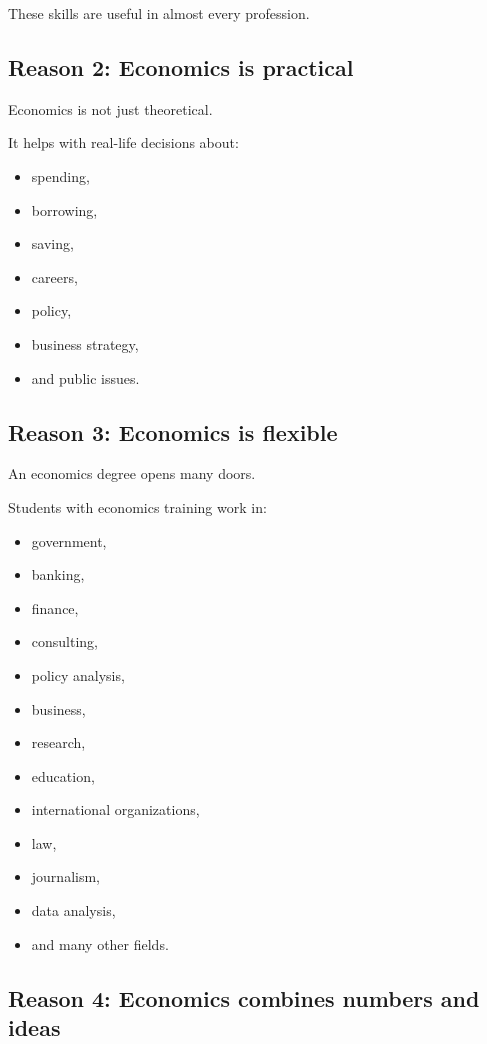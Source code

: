 \documentclass[12pt]{article}
\begin{document}
These skills are useful in almost every profession.

\subsection*{Reason 2: Economics is practical}

Economics is not just theoretical.

It helps with real-life decisions about:
\begin{itemize}[leftmargin=2em]
    \item spending,
    \item borrowing,
    \item saving,
    \item careers,
    \item policy,
    \item business strategy,
    \item and public issues.
\end{itemize}

\subsection*{Reason 3: Economics is flexible}

An economics degree opens many doors.

Students with economics training work in:
\begin{itemize}[leftmargin=2em]
    \item government,
    \item banking,
    \item finance,
    \item consulting,
    \item policy analysis,
    \item business,
    \item research,
    \item education,
    \item international organizations,
    \item law,
    \item journalism,
    \item data analysis,
    \item and many other fields.
\end{itemize}

\subsection*{Reason 4: Economics combines numbers and ideas}
\end{document}

